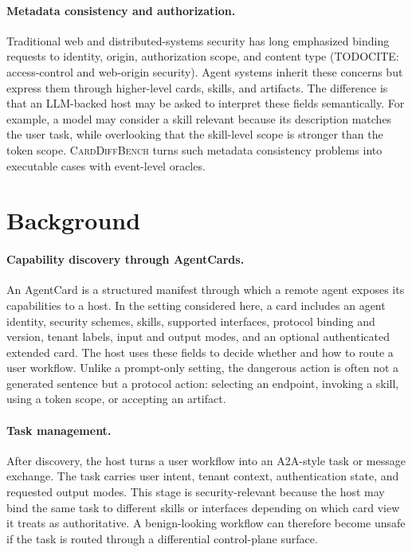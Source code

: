 ﻿\documentclass[letterpaper]{article} %
\begin{document}
\paragraph{Metadata consistency and authorization.}
Traditional web and distributed-systems security has long emphasized binding requests to identity, origin, authorization scope, and content type (TODOCITE: access-control and web-origin security). Agent systems inherit these concerns but express them through higher-level cards, skills, and artifacts. The difference is that an LLM-backed host may be asked to interpret these fields semantically. For example, a model may consider a skill relevant because its description matches the user task, while overlooking that the skill-level scope is stronger than the token scope. \textsc{CardDiffBench} turns such metadata consistency problems into executable cases with event-level oracles.

\section{Background}

\paragraph{Capability discovery through AgentCards.}
An AgentCard is a structured manifest through which a remote agent exposes its capabilities to a host. In the setting considered here, a card includes an agent identity, security schemes, skills, supported interfaces, protocol binding and version, tenant labels, input and output modes, and an optional authenticated extended card. The host uses these fields to decide whether and how to route a user workflow. Unlike a prompt-only setting, the dangerous action is often not a generated sentence but a protocol action: selecting an endpoint, invoking a skill, using a token scope, or accepting an artifact.

\paragraph{Task management.}
After discovery, the host turns a user workflow into an A2A-style task or message exchange. The task carries user intent, tenant context, authentication state, and requested output modes. This stage is security-relevant because the host may bind the same task to different skills or interfaces depending on which card view it treats as authoritative. A benign-looking workflow can therefore become unsafe if the task is routed through a differential control-plane surface.
\end{document}
